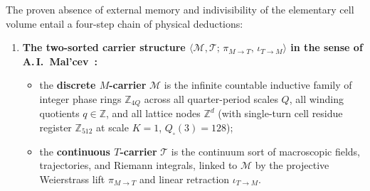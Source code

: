 \documentclass[11pt,a4paper]{article}
\theoremstyle{plain}
\theoremstyle{definition}
\begin{document}
The proven absence of external memory and indivisibility of the elementary cell volume entail a four-step chain of physical deductions:
\begin{enumerate}[label=\textbf{Step \arabic*.},leftmargin=*]
\item \textbf{The two-sorted carrier structure $\langle\mathcal{M},\mathcal{T};\,\pi_{M\to T},\,\iota_{T\to M}\rangle$ in the sense of A.\,I.~Mal'cev~\cite{Malcev1973}:}
  \begin{itemize}[leftmargin=*]
  \item the \textbf{discrete $M$-carrier} $\mathcal{M}$ is the infinite countable inductive family of integer phase rings $\mathbb{Z}_{4Q}$ across all quarter-period scales $Q$, all winding quotients $q\in\mathbb{Z}$, and all lattice nodes $\mathbb{Z}^d$ (with single-turn cell residue register $\mathbb{Z}_{512}$ at scale $K=1$, $Q_\square(3)=128$);
  \item the \textbf{continuous $T$-carrier} $\mathcal{T}$ is the continuum sort of macroscopic fields, trajectories, and Riemann integrals, linked to $\mathcal{M}$ by the projective Weierstrass lift $\pi_{M\to T}$ and linear retraction $\iota_{T\to M}$.
  \end{itemize}


\end{enumerate}
\end{document}
